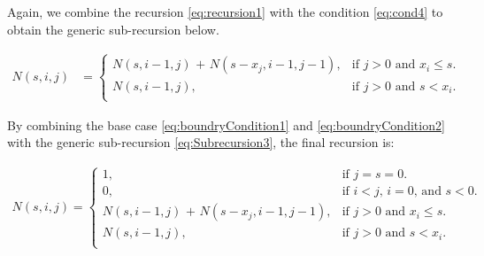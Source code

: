 \documentclass[a4paper]{article}
\begin{document}
Again, we combine the recursion \ref{eq:recursion1} with the condition \ref{eq:cond4} to obtain the generic sub-recursion below.

\begin{align}
\label{eq:Subrecursion3}
N(s,i,j) &=\begin{cases}
    \text{$N(s,i-1,j)$ + $N(s-x_{j},i-1,j-1)$}, & \text{if $j>0$ and $x_{i} \leq s$}.\\
    \text{$N(s,i-1,j)$}, & \text{if $j>0$ and $s < x_{i}$}.\\
  \end{cases}
\end{align}

By combining the base case \ref{eq:boundryCondition1} and \ref{eq:boundryCondition2} with the generic sub-recursion \ref{eq:Subrecursion3}, the final recursion is:

\begin{align}
\label{eq:finalRecursion}
\text{$N(s,i,j)$}   =\begin{cases}
    1, & \text{if $j=s=0$.} \\
    0, & \text{if $i < j$, $i=0$, and $s < 0$.} \\
    \text{$N(s,i-1,j)$ + $N(s-x_{j},i-1,j-1)$}, & \text{if $j>0$ and $x_{i} \leq s$}. \\
    \text{$N(s,i-1,j)$}, & \text{if $j>0$ and $s < x_{i}$}. \\
  \end{cases}
\end{align}
\end{document}
